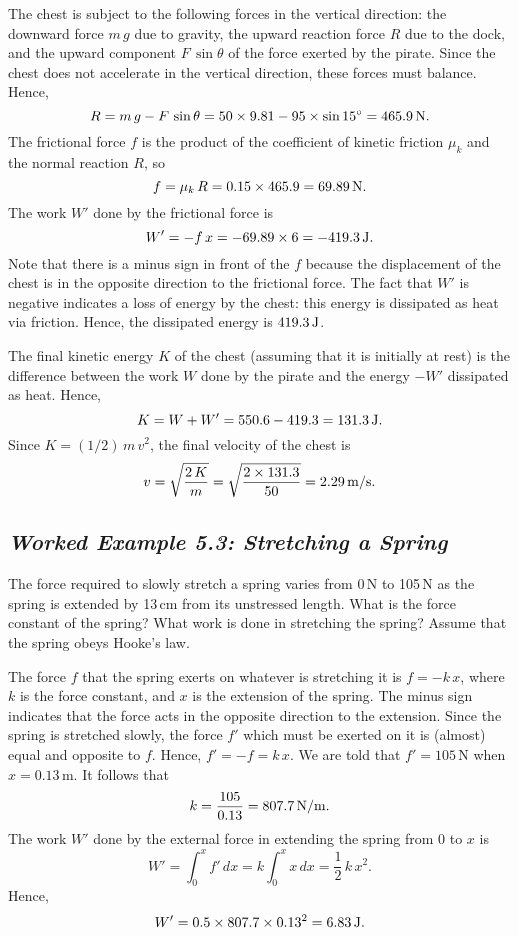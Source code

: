 The chest is subject to the following forces in the vertical direction:
the downward force $m\,g$ due to gravity, the upward reaction force $R$
due to the dock, and the upward component $F\,\sin\theta$ of the force
exerted by the pirate. Since the chest does not accelerate in the
vertical direction, these forces must balance. Hence,
$$
R = m\,g - F\,\sin\theta = 50\times 9.81 - 95\times\sin 15^\circ
= 465.9\,{\rm N}.
$$
The frictional force $f$ is the product of the coefficient of
kinetic friction $\mu_k$ and the normal reaction $R$, so
$$
f = \mu_k\,R = 0.15\times 465.9 = 69.89\,{\rm N}.
$$
The work $W'$ done by the frictional force is
$$
W' = - f\,x = - 69.89\times 6 = -419.3\,{\rm J}.
$$
Note that there is a minus sign in front of the $f$ because the
displacement of the chest is in the opposite direction to
the frictional force. The fact that $W'$ is negative indicates
a loss of energy by the chest: this energy is dissipated as
heat via friction. Hence, the dissipated energy
is $ 419.3\,{\rm J}$. 

The final kinetic energy $K$ of the chest (assuming that it
is initially at rest) is the difference between the work $W$
done by the pirate and the energy $-W'$ dissipated as heat. 
Hence,
$$
K = W + W' =  550.6 - 419.3 = 131.3\,{\rm J}.
$$
Since $K= (1/2)\,m\,v^2$,  the final velocity of the chest
is
$$
v = \sqrt{\frac{2\,K}{m}} = \sqrt{\frac{2\times 131.3}{50}} = 2.29\,{\rm m/s}.
$$

\subsection*{\em Worked Example 5.3: Stretching a Spring}
 The force required to slowly stretch a spring
varies from 0\,N to 105\,N as the spring is extended by 13\,cm
from its unstressed length. What is the force constant of the spring?
What work is done in stretching the spring? Assume that the spring
obeys Hooke's law.

The force $f$ that the spring exerts on whatever is stretching it
is $f=-k\,x$, where $k$ is the force constant, and $x$ is the extension
of the spring. The minus sign indicates that the force acts in the opposite
direction to the extension. Since the spring is stretched slowly, the force
$f'$ which must be exerted on it is (almost) equal and opposite to $f$.
Hence, $f' = -f = k\,x$. We are told that $f'= 105$\,N when $x=0.13$\,m. It
follows that
$$
k = \frac{105}{0.13} = 807.7\,{\rm N/m}.
$$
The work $W'$ done by the external force in extending the spring from 0 to $x$ is
$$
W' = \int_0^x f'\,dx = k\int_0^x x\,dx = \frac{1}{2}\,k\,x^2.
$$
Hence, 
$$ 
W' = 0.5\times 807.7\times 0.13^2 = 6.83\,{\rm J}.
$$

